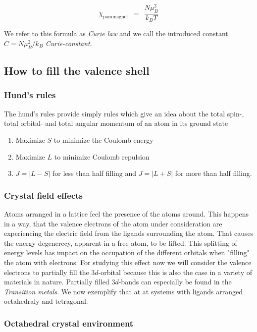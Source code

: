 \documentclass[10pt]{report}
\numberwithin{equation}{chapter}
\begin{document}
\begin{equation}
  \chi_\text{paramagnet} ~~=~~ \frac{N \mu_B^2}{k_B T} 
\end{equation}

We refer to this formula as \textit{Curie law} and we call the introduced constant $C = N \mu_B^2/k_B$ \textit{Curie-constant}.


\subsection{How to fill the valence shell}

\subsubsection{Hund's rules}

The hund's rules provide simply rules which give an idea about the total spin-, total orbital- and total angular momentum of an atom in its ground state

\begin{enumerate}
  \item{Maximize $S$ to minimize the Coulomb energy}
  \item{Maximize $L$ to minimize Coulomb repulsion}
  \item{ $J=|L-S|$ for less than half filling and $J=|L+S|$ for more than half filling.}
\end{enumerate}

\subsubsection{Crystal field effects}

Atoms arranged in a lattice feel the presence of the atoms around. This happens in a way, that the valence electrons of the atom under consideration are experiencing the electric field from the ligands surrounding the atom. That causes the energy degenerecy, apparent in a free atom, to be lifted. This splitting of energy levels has impact on the occupation of the different orbitals when "filling" the atom with electrons.
For studying this effect now we will consider the valence electrons to partially fill the $3d$-orbital because this is also the case in a variety of materials in nature. Partially filled $3d$-bands can especially be found in the \textit{Transition metals}. 
 We now exemplify that at at systems with ligands arranged octahedraly and tetragonal. 


\subsubsection{Octahedral crystal environment}
\end{document}
